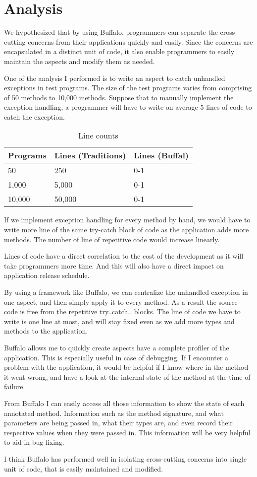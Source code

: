 \chapter{Analysis}

We hypothesized that by using Buffalo, programmers can separate the cross-cutting concerns from their applications quickly and easily. Since the concerns are encapsulated in a distinct unit of code, it also enable programmers to easily maintain the aspects and modify them as needed.

One of the analysis I performed is to write an aspect to catch unhandled exceptions in test programs. The size of the test programs varies from comprising of 50 methods to 10,000 methods. Suppose that to manually implement the exception handling, a programmer will have to write on average 5 lines of code to catch the exception.

\begin{table}[H]
\centering
\begin{tabular}{|l|l|l|}
\hline
Programs & Lines (Traditions) & Lines (Buffal)\\
\hline
50 & 250 & 0-1\\
1,000 & 5,000 & 0-1\\
10,000 & 50,000 & 0-1\\
\hline
\end{tabular}
\caption{Line counts}
\label{tab:lines_tbl}
\end{table}

If we implement exception handling for every method by hand, we would have to write more line of the same try-catch block of code as the application adds more methods. The number of line of repetitive code would increase linearly.

Lines of code have a direct correlation to the cost of the development as it will take programmers more time. And this will also have a direct impact on application release schedule.

By using a framework like Buffalo, we can centralize the unhandled exception in one aspect, and then simply apply it to every method. As a result the source code is free from the repetitive try..catch.. blocks. The line of code we have to write is one line at most, and will stay fixed even as we add more types and methods to the application.

Buffalo allows me to quickly create aspects have a complete profiler of the application. This is especially useful in case of debugging. If I encounter a problem with the application, it would be helpful if I know where in the method it went wrong, and have a look at the internal state of the method at the time of failure.

From Buffalo I can easily access all those information to show the state of each annotated method. Information such as the method signature, and what parameters are being passed in, what their types are, and even record their respective values when they were passed in. This information will be very helpful to aid in bug fixing.

I think Buffalo has performed well in isolating cross-cutting concerns into single unit of code, that is easily maintained and modified.
